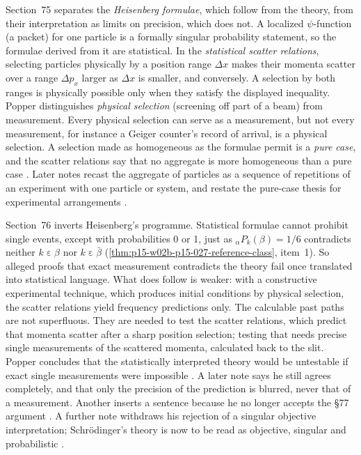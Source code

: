 Section~75 separates the \emph{Heisenberg formulae}, which follow from
the theory, from their interpretation as limits on precision, which does
not. A localized \(\psi\)-function (a packet) for one particle is a formally singular probability
statement, so the formulae derived from it are statistical. In the
\emph{statistical scatter relations}, selecting particles physically by
a position range \(\Delta x\) makes their momenta scatter over a range
\(\Delta p_x\) larger as \(\Delta x\) is smaller, and conversely. A
selection by both ranges is physically possible only when they satisfy
the displayed inequality. Popper distinguishes \emph{physical
selection} (screening off part of a beam) from measurement. Every
physical selection can serve as a measurement, but not every measurement,
for instance a Geiger counter's record of arrival, is a physical
selection. A selection made as homogeneous as the formulae permit is a
\emph{pure case}, and the scatter relations say that no aggregate is more
homogeneous than a pure case \parencite[\S75]{Popper2002LogicDiscoveryUI}.
Later notes recast the aggregate of particles as a sequence of
repetitions of an experiment with one particle or system, and restate the
pure-case thesis for experimental arrangements
\parencite[\S75, notes~*1, *2]{Popper2002LogicDiscoveryUI}.

Section~76 inverts Heisenberg's programme. Statistical formulae cannot
prohibit single events, except with probabilities 0 or 1, just as
\({}_{\alpha}P_k(\beta)=1/6\) contradicts neither
\(k\mathrel{\varepsilon}\beta\) nor \(k\mathrel{\varepsilon}\bar\beta\)
(\cref{thm:p15-w02b-p15-027-reference-class}, item~1). So alleged proofs
that exact measurement contradicts the theory fail once translated into
statistical language. What does follow is weaker: with a constructive
experimental technique, which produces initial conditions by physical
selection, the scatter relations yield frequency predictions only. The
calculable past paths are not superfluous. They are needed to test the
scatter relations, which predict that momenta scatter after a sharp
position selection; testing that needs precise single measurements of
the scattered momenta, calculated back to the slit. Popper concludes
that the statistically interpreted theory would be untestable if exact
single measurements were impossible
\parencite[\S76]{Popper2002LogicDiscoveryUI}. A later note says he still
agrees completely, and that only the precision of the prediction is
blurred, never that of a measurement. Another inserts a sentence because
he no longer accepts the \S77 argument
\parencite[\S76, notes~*1, *2]{Popper2002LogicDiscoveryUI}. A further
note withdraws his rejection of a singular objective interpretation;
Schrödinger's theory is now to be read as objective, singular and
probabilistic \parencite[\S76, note~*3]{Popper2002LogicDiscoveryUI}.


